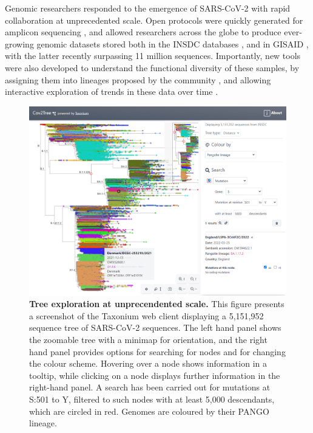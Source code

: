 \documentclass[twocolumn]{bioRxiv}
\begin{document}
Genomic researchers responded to the emergence of SARS-CoV-2 with rapid collaboration at unprecedented scale. Open protocols were quickly generated for amplicon sequencing \citep{Tyson2020}, and allowed researchers across the globe to produce ever-growing genomic datasets stored both in the INSDC databases \citep{insdc}, and in GISAID \citep{shu2017gisaid}, with the latter recently surpassing 11 million sequences. Importantly, new tools were also developed to understand the functional diversity of these samples, by assigning them into lineages proposed by the community \citep{rambaut2020dynamic, o2021assignment}, and allowing interactive exploration of trends in these data over time \citep{hodcroft_2021, chen2022cov, outbreakinfo}.


\begin{figure}

\begin{center}
\includegraphics[width=\linewidth]{Figures/cov2tree.png}
\end{center}
\caption{\textbf{Tree exploration at unprecendented scale.} This figure presents a screenshot of the Taxonium web client displaying a 5,151,952 sequence tree of SARS-CoV-2 sequences. The left hand panel shows the zoomable tree with a minimap for orientation, and the right hand panel provides options for searching for nodes and for changing the colour scheme. Hovering over a node shows information in a tooltip, while clicking on a node displays further information in the right-hand panel. A search has been carried out for mutations at S:501 to Y, filtered to such nodes with at least 5,000 descendants, which are circled in red. Genomes are coloured by their PANGO lineage.}
\label{fig:taxonium_client}
\end{figure}
\end{document}
